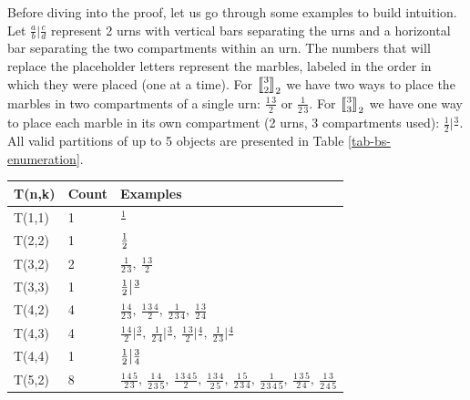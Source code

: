 \documentclass[a4paper]{amsart}
\numberwithin{equation}{section}
\newcommand{\mStirling}[0]{\genfrac{\llbracket}{\rrbracket}{0pt}{}}
\begin{document}
Before diving into the proof, let us go through some examples to build intuition. Let $\frac{a}{b}\big|\frac{c}{d}$ represent 2 urns with vertical bars separating the urns and a horizontal bar separating the two compartments within an urn. The numbers that will replace the placeholder letters represent the marbles, labeled in the order in which they were placed (one at a time).
For $\mStirling{3}{2}_2$ we have two ways to place the marbles in two compartments of a single urn: $\frac{1\,3}{2}$ or $\frac{1}{2\,3}$.
For $\mStirling{3}{3}_2$ we have one way to place each marble in its own compartment (2 urns, 3 compartments used): $\frac{1}{2}\big|\frac{3}{}$. All valid partitions of up to 5 objects are presented in Table \ref{tab-bs-enumeration}.
\bgroup
\renewcommand{\arraystretch}{2}
\begin{table}[htbp]
    \centering
        \begin{tabular}{|l|l|p{10.5cm}|}
        \hline
        T(n,k) & Count & Examples \\
        \hline
        T(1,1) & 1 & \texttt{$
            \frac{1}{}
        $}\\
        \hline
        T(2,2) & 1 & \texttt{$
            \frac{1}{2}
            \smallskip
        $}\\
        \hline
        T(3,2) & 2 & \texttt{$
            \frac{1}{2\,3},\
            \frac{1\,3}{2}
        $}\\
        T(3,3) & 1 & \texttt{$
            \frac{1}{2}\big|\frac{3}{}
            \smallskip
        $}\\
        \hline
        T(4,2) & 4 & \texttt{$
            \frac{1\,4}{2\,3},\
            \frac{1\,3\,4}{2},\
            \frac{1}{2\,3\,4},\
            \frac{1\,3}{2\,4}
        $} \\
        T(4,3) & 4 & \texttt{$
            \frac{1\,4}{2}\big|\frac{3}{},\
            \frac{1}{2\,4}\big|\frac{3}{},\
            \frac{1\,3}{2}\big|\frac{4}{},\
            \frac{1}{2\,3}\big|\frac{4}{}
        $}\\
        T(4,4) & 1 & \texttt{$
            \frac{1}{2}\big|\frac{3}{4}
            \smallskip
        $} \\
        \hline
        T(5,2) & 8 & \texttt{$
            \frac{1\,4\,5}{2\,3},\
            \frac{1\,4}{2\,3\,5},\
            \frac{1\,3\,4\,5}{2},\
            \frac{1\,3\,4}{2\,5},\
            \frac{1\,5}{2\,3\,4},\
            \frac{1}{2\,3\,4\,5},\
            \frac{1\,3\,5}{2\,4},\
            \frac{1\,3}{2\,4\,5}
        $}\\

\end{tabular}
\end{table}
\end{document}
